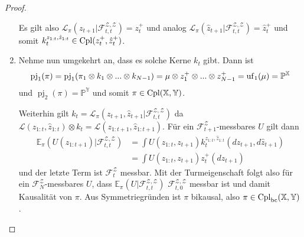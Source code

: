 \begin{proof}
\begin{enumerate}
Es gilt also $\mathcal{L}_\pi(z_{t+1} \vert \mathcal{F}_{t,t}^{\mathcal{Z,Z}}) = z_t^+$ und analog $\mathcal{L}_\pi(\hat{z}_{t+1} \vert \mathcal{F}_{t,t}^{\mathcal{Z,Z}}) = \hat{z}_t^+$ und somit $k_t^{z_{1:t}, \hat{z}_{1:t}} \in \operatorname{Cpl}(z_t^+, \hat{z}_t^+)$.
\item
Nehme nun umgekehrt an, dass es solche Kerne $k_t$ gibt. Dann ist 
$$\operatorname{pj}_1(\pi) = \operatorname{pj}_1(\pi_1 \otimes k_1 \otimes ... \otimes k_{N-1}) = \mu \otimes z_1^+ \otimes ... \otimes z_{N-1}^+ = \operatorname{uf}_1(\mu) = \mathbb{P}^\mathbb{X}$$
und $\operatorname{pj}_2(\pi) = \mathbb{P}^\mathbb{Y}$ und somit $\pi \in \operatorname{Cpl}(\mathbb{X}, \mathbb{Y})$. 

Weiterhin gilt $k_t = \mathcal{L}_\pi(z_{t+1}, \hat{z}_{t+1} \vert \mathcal{F}_{t,t}^{\mathcal{Z,Z}})$ da $\mathcal{L}(z_{1:t}, \hat{z}_{1:t}) \otimes k_t = \mathcal{L}(z_{1:t+1}, \hat{z}_{1:t+1})$. Für ein $\mathcal{F}_{t+1}^\mathcal{Z}$-messbares $U$ gilt dann
\begin{align*}
    \mathbb{E}_\pi(U(z_{1:t+1}) \vert \mathcal{F}_{t,t}^{\mathcal{Z,Z}}) &= \int U(z_{1:t}, z_{t+1}) k_t^{z_{1:t}, \hat{z}_{1:t}}(dz_{t+1}, d\hat{z}_{t+1}) \\
    &= \int U(z_{1:t}, z_{t+1}) z_t^+(dz_{t+1})
\end{align*}
und der letzte Term ist $\mathcal{F}_{t}^{\mathcal{Z}}$ messbar. Mit der Turmeigenschaft folgt also für ein $\mathcal{F}_N^\mathcal{Z}$-messbares $U$, dass $\mathbb{E}_\pi\left(U \vert \mathcal{F}_{t,t}^{\mathcal{Z,Z}}\right)$ $\mathcal{F}_{t,0}^{\mathcal{Z,Z}}$ messbar ist und damit Kausalität von $\pi$. Aus Symmetriegründen ist $\pi$ bikausal, also $\pi \in \operatorname{Cpl}_{\operatorname{bc}}(\mathbb{X}, \mathbb{Y})$.
\end{enumerate}
\end{proof}